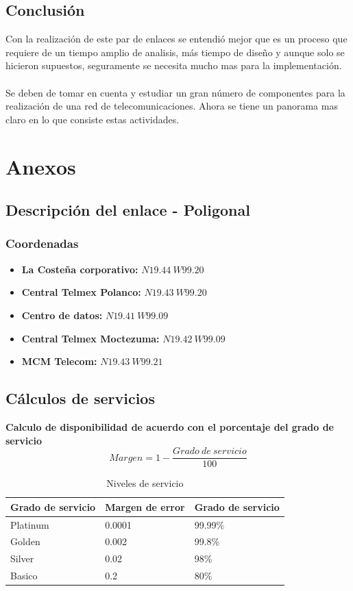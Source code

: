 \documentclass[12pt,letterpaper]{article}
\begin{document}
\subsection{Conclusión}
Con la realización de este par de enlaces se entendió mejor que es un proceso que requiere 
de un tiempo amplio de analisis, más tiempo de diseño y aunque solo se hicieron supuestos, 
seguramente se necesita mucho mas para la implementación.
\\ \\
Se deben de tomar en cuenta y estudiar un gran número de componentes para la realización de 
una red de telecomunicaciones. Ahora se tiene un panorama mas claro en lo que consiste 
estas actividades.

\newpage
\section{Anexos}
\subsection{Descripción del enlace - Poligonal}
\subsubsection{Coordenadas}
\begin{itemize}
    \item \textbf{La Costeña corporativo:} $N 19.44 \ W 99.20$
    \item \textbf{Central Telmex Polanco:} $N 19.43 \ W 99.20$
    \item \textbf{Centro de datos:} $N 19.41 \ W 99.09$
    \item \textbf{Central Telmex Moctezuma:} $N 19.42 \ W 99.09$
    \item \textbf{MCM Telecom:} $N 19.43 \ W 99.21$
\end{itemize}

\newpage
\subsection{Cálculos de servicios}
\textbf{Calculo de disponibilidad de acuerdo con el porcentaje del grado de servicio}
\begin{equation}
    Margen=1-\frac{Grado \ de \ servicio}{100}
\end{equation}

\begin{table}[ht]
    \centering
    \begin{tabular}{|l|l|l|}
    \hline
    Grado de servicio & Margen de error & Grado de servicio \\ \hline
    Platinum & 0.0001 & 99.99\% \\ \hline
    Golden & 0.002 & 99.8\% \\ \hline
    Silver & 0.02 & 98\% \\ \hline
    Basico & 0.2 & 80\% \\ \hline
    \end{tabular}
    \caption{Niveles de servicio}
    \label{my-label}
\end{table}
\end{document}
